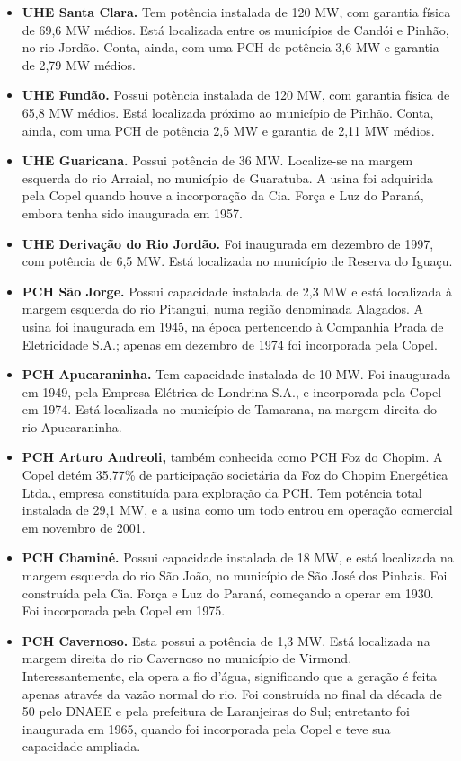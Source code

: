 \documentclass[grad,numbers]{coppe}
\begin{document}
\begin{itemize}
  \item
    \textbf{UHE Santa Clara.} Tem potência instalada de 120 MW, com garantia física de 69,6 MW médios. Está localizada entre os municípios de Candói e Pinhão, no rio Jordão. Conta, ainda, com uma PCH de potência 3,6 MW e garantia de 2,79 MW médios.
  \item
    \textbf{UHE Fundão.} Possui potência instalada de 120 MW, com garantia física de 65,8 MW médios. Está localizada próximo ao município de Pinhão. Conta, ainda, com uma PCH de potência 2,5 MW e garantia de 2,11 MW médios.
  \item
    \textbf{UHE Guaricana.} Possui potência de 36 MW. Localize-se na margem esquerda do rio Arraial, no município de Guaratuba. A usina foi adquirida pela Copel quando houve a incorporação da Cia. Força e Luz do Paraná, embora tenha sido inaugurada em 1957.
  \item
    \textbf{UHE Derivação do Rio Jordão.} Foi inaugurada em dezembro de 1997, com potência de 6,5 MW. Está localizada no município de Reserva do Iguaçu.
  \item
    \textbf{PCH São Jorge.} Possui capacidade instalada de 2,3 MW e está localizada à margem esquerda do rio Pitangui, numa região denominada Alagados. A usina foi inaugurada em 1945, na época pertencendo à Companhia Prada de Eletricidade S.A.; apenas em dezembro de 1974 foi incorporada pela Copel.
  \item
    \textbf{PCH Apucaraninha.} Tem capacidade instalada de 10 MW. Foi inaugurada em 1949, pela Empresa Elétrica de Londrina S.A., e incorporada pela Copel em 1974. Está localizada no município de Tamarana, na margem direita do rio Apucaraninha.
  \item
    \textbf{PCH Arturo Andreoli,} também conhecida como PCH Foz do Chopim. A Copel detém 35,77\% de participação societária da Foz do Chopim Energética Ltda., empresa constituída para exploração da PCH. Tem potência total instalada de 29,1 MW, e a usina como um todo entrou em operação comercial em novembro de 2001.
  \item
    \textbf{PCH Chaminé.} Possui capacidade instalada de 18 MW, e está localizada na margem esquerda do rio São João, no município de São José dos Pinhais. Foi construída pela Cia. Força e Luz do Paraná, começando a operar em 1930. Foi incorporada pela Copel em 1975.
  \item
    \textbf{PCH Cavernoso.} Esta possui a potência de 1,3 MW. Está localizada na margem direita do rio Cavernoso no município de Virmond. Interessantemente, ela opera a fio d'água, significando que a geração é feita apenas através da vazão normal do rio. Foi construída no final da década de 50 pelo DNAEE e pela prefeitura de Laranjeiras do Sul; entretanto foi inaugurada em 1965, quando foi incorporada pela Copel e teve sua capacidade ampliada.

\end{itemize}
\end{document}
